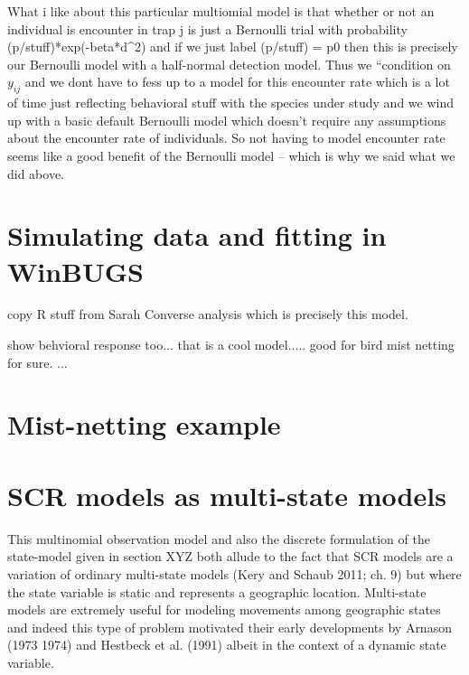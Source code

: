 {What i like about this particular multiomial model is that whether or not
an individual is encounter in trap j is just a Bernoulli trial with
probability 
(p/stuff)*exp(-beta*d^2)
and if we just label (p/stuff) = p0 then this is precisely our
Bernoulli model with a half-normal detection model.  Thus we ``condition
on $y_{ij}$ and we dont have to fess up to a model for this encounter
rate which is a lot of time just reflecting behavioral stuff with the
species under study and we wind up with a basic default Bernoulli model
which doesn't require any assumptions about the encounter rate of 
individuals.  So not having to model encounter rate seems like a good
benefit of the Bernoulli model -- which is why we said what we did above.


\section{Simulating data and fitting in WinBUGS}

copy R stuff from Sarah Converse analysis which is precisely this model.

show behvioral response too... that is a cool model..... good for
bird mist netting for sure. ...


\section{ Mist-netting example}



\section{SCR models as multi-state models}

This multinomial observation model and also the discrete formulation
of the state-model given in section XYZ both allude to the fact that
SCR models are a variation of 
ordinary multi-state models (Kery and Schaub 2011;
ch. 9) but where the state variable is static and represents a
geographic location. Multi-state models are extremely useful for
modeling movements among geographic states and indeed this type of
problem motivated their early developments by Arnason (1973 1974) and
Hestbeck et al. (1991) albeit in the context of a dynamic state
variable.  

}
